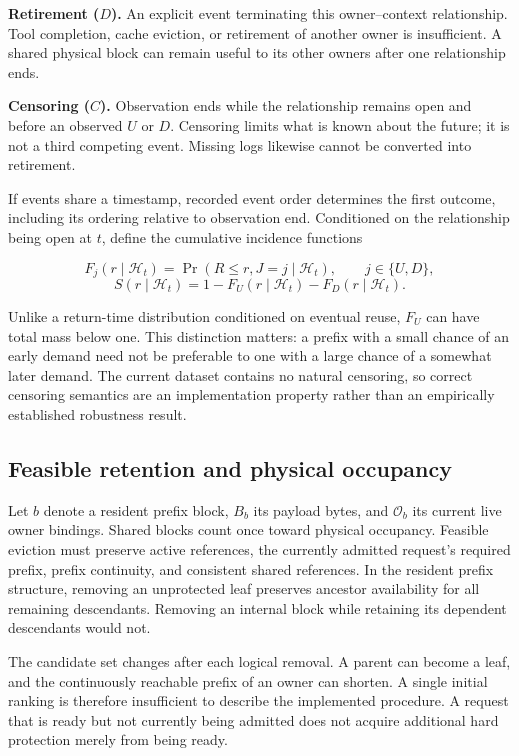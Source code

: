 \documentclass[sigconf, screen, review, balance=false]{acmart}
\begin{document}
\textbf{Retirement (\(D\)).} An explicit event terminating this
owner--context relationship. Tool completion, cache eviction, or
retirement of another owner is insufficient. A shared physical block can
remain useful to its other owners after one relationship ends.

\textbf{Censoring (\(C\)).} Observation ends while the relationship
remains open and before an observed \(U\) or \(D\). Censoring limits
what is known about the future; it is not a third competing event.
Missing logs likewise cannot be converted into retirement.

If events share a timestamp, recorded event order determines the first
outcome, including its ordering relative to observation end. Conditioned
on the relationship being open at \(t\), define the cumulative incidence
functions

\[
F_j(r\mid\mathcal H_t)=\Pr(R\le r,J=j\mid\mathcal H_t),
\qquad j\in\{U,D\},
\] \[
S(r\mid\mathcal H_t)=1-F_U(r\mid\mathcal H_t)-F_D(r\mid\mathcal H_t).
\]

Unlike a return-time distribution conditioned on eventual reuse, \(F_U\)
can have total mass below one. This distinction matters: a prefix with a
small chance of an early demand need not be preferable to one with a
large chance of a somewhat later demand. The current dataset contains no
natural censoring, so correct censoring semantics are an implementation
property rather than an empirically established robustness result.

\subsection{Feasible retention and physical
occupancy}\label{feasible-retention-and-physical-occupancy}

Let \(b\) denote a resident prefix block, \(B_b\) its payload bytes, and
\(\mathcal O_b\) its current live owner bindings. Shared blocks count
once toward physical occupancy. Feasible eviction must preserve active
references, the currently admitted request's required prefix, prefix
continuity, and consistent shared references. In the resident prefix
structure, removing an unprotected leaf preserves ancestor availability
for all remaining descendants. Removing an internal block while
retaining its dependent descendants would not.

The candidate set changes after each logical removal. A parent can
become a leaf, and the continuously reachable prefix of an owner can
shorten. A single initial ranking is therefore insufficient to describe
the implemented procedure. A request that is ready but not currently
being admitted does not acquire additional hard protection merely from
being ready.
\end{document}
